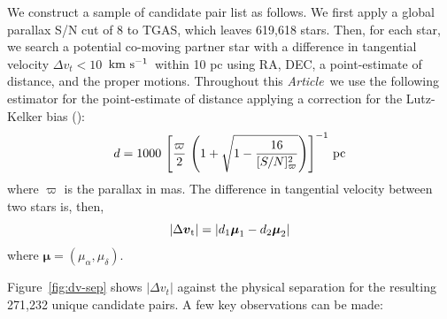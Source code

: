 \documentclass[manuscript, letterpaper]{aastex6}
\newcommand{\acronym}[1]{{\small{#1}}}
\newcommand{\documentname}{\textsl{Article}}
\newcommand{\tgas}{\acronym{TGAS}}
\newcommand{\bs}[1]{\boldsymbol{#1}}
\renewcommand{\vec}[1]{\bs{#1}}
\newcommand{\kms}{\ensuremath{\rm km~s^{-1}}}
\newcommand{\snr}{[S/N]_\varpi}
\begin{document}
We construct a sample of candidate pair list as follows.
We first apply a global parallax S/N cut of 8 to \tgas, which leaves 619,618 stars.
Then, for each star, we search a potential co-moving partner star with a
difference in tangential velocity $\Delta v_t < 10$~\kms\ within 10 pc
using RA, DEC, a point-estimate of distance, and the proper motions.
Throughout this \documentname\, we use the following estimator for
the point-estimate of distance applying a correction for the Lutz-Kelker bias
(\citealt{lutzkelker}):
\begin{equation}
  d = 1000 \, \left[\frac{\varpi}{2} \,
    \left(1 + \sqrt{1 - \frac{16}{\snr^2}} \right) \right]^{-1} \, {\rm pc}
\end{equation}
where $\varpi$ is the parallax in mas.
The difference in tangential velocity between two stars is, then,
\begin{equation}
  |\Delta \vec{v}_{\rm t}| = |d_1 \vec\mu_1 - d_2 \vec\mu_2|
\end{equation}
where $\vec\mu = (\mu_\alpha, \mu_\delta)$.

Figure~\ref{fig:dv-sep} shows $|\Delta v_t|$ against the physical separation
for the resulting 271,232 unique candidate pairs.
A few key observations can be made:
\end{document}
